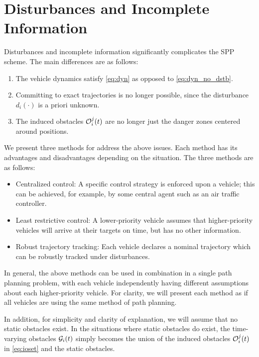 \section{Disturbances and Incomplete Information \label{sec:obs_gen}}
Disturbances and incomplete information significantly complicates the SPP scheme. The main differences are as follows:

\begin{enumerate}
\item The vehicle dynamics satisfy \eqref{eq:dyn} as opposed to \eqref{eq:dyn_no_dstb}.
\item Committing to exact trajectories is no longer possible, since the disturbance $d_i(\cdot)$ is a priori unknown.
\item The induced obstacles $\mathcal{O}_i^j(t)$ are no longer just the danger zones centered around positions.
\end{enumerate}

We present three methods for address the above issues. Each method has its advantages and disadvantages depending on the situation. The three methods are as follows:
\begin{itemize}
\item Centralized control: A specific control strategy is enforced upon a vehicle; this can be achieved, for example, by some central agent such as an air traffic controller.
\item Least restrictive control: A lower-priority vehicle assumes that higher-priority vehicles will arrive at their targets on time, but has no other information.
\item Robust trajectory tracking: Each vehicle declares a nominal trajectory which can be robustly tracked under disturbances.
\end{itemize}

In general, the above methods can be used in combination in a single path planning problem, with each vehicle independently having different assumptions about each higher-priority vehicle. For clarity, we will present each method as if all vehicles are using the same method of path planning.

In addition, for simplicity and clarity of explanation, we will assume that no static obstacles exist. In the situations where static obstacles do exist, the time-varying obstacles $\mathcal{G}_i(t)$ simply becomes the union of the induced obstacles $\mathcal{O}_i^j(t)$ in \eqref{eq:ioset} and the static obstacles.

